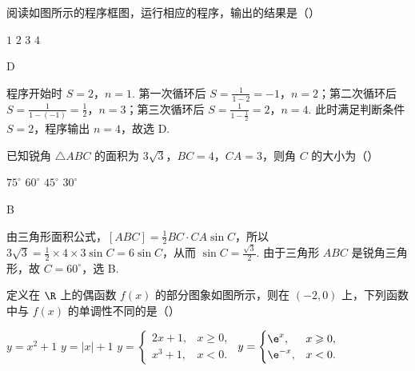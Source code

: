 \begin{problem}
阅读如图所示的程序框图，运行相应的程序，输出的结果是（\quad）


\choices
    {\(1\)}
    {\(2\)}
    {\(3\)}
    {\(4\)}
\end{problem}

\begin{answer}
D
\end{answer}

\begin{solution}
程序开始时 \(S=2\)，\(n=1\). 第一次循环后 \(S=\frac{1}{1-2}=-1\)，\(n=2\)；第二次循环后 \(S=\frac{1}{1-(-1)}=\frac{1}{2}\)，\(n=3\)；第三次循环后 \(S=\frac{1}{1-\frac{1}{2}}=2\)，\(n=4\). 此时满足判断条件 \(S=2\)，程序输出 \(n=4\)，故选 D.
\end{solution}

\begin{problem}
已知锐角 \(\triangle ABC\) 的面积为 \(3\sqrt{3}\)，\(BC = 4\)，\(CA = 3\)，则角 \(C\) 的大小为（\quad）

\choices
    {\(75^{\circ}\)}
    {\(60^{\circ}\)}
    {\(45^{\circ}\)}
    {\(30^{\circ}\)}
\end{problem}

\begin{answer}
B
\end{answer}

\begin{solution}
由三角形面积公式，\([ABC]=\frac{1}{2}BC\cdot CA\sin C\)，所以 \(3\sqrt{3}=\frac{1}{2}\times4\times3\sin C=6\sin C\)，从而 \(\sin C=\frac{\sqrt{3}}{2}\). 由于三角形 \(ABC\) 是锐角三角形，故 \(C=60^{\circ}\)，选 B.
\end{solution}

\begin{problem}
定义在 \(\R\) 上的偶函数 \(f(x)\) 的部分图象如图所示，则在 \((-2,0)\) 上，下列函数中与 \(f(x)\) 的单调性不同的是（\quad）


\choices
    {\(y = x^{2} + 1\)}
    {\(y = |x| + 1\)}
    {\( y = \begin{cases}
2x + 1, & x \geqslant 0,\\
x^3 + 1, & x < 0.
\end{cases} \)}
    {\( y = \begin{cases}
\e^x, & x \geqslant 0,\\
\e^{-x}, & x < 0.
    \end{cases} \)}
\end{problem}

